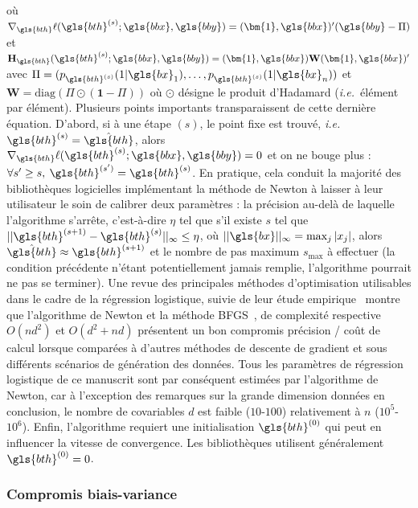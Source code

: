où $ \nabla_{\gls{bth}} \ell(\gls{bth}^{(s)};\gls{bbx},\gls{bby}) = (\bm{1},\gls{bbx})' (\gls{bby} - \Pi)$ et $\mathbf{H}_{{\gls{bth}}}(\gls{bth}^{(s)};\gls{bbx},\gls{bby}) = (\bm{1},\gls{bbx}) \mathbf{W} (\bm{1},\gls{bbx})'$ avec $\Pi = (p_{\gls{bth}^{(s)}}(1|\gls{bx}_1),\dots,p_{\gls{bth}^{(s)}}(1|\gls{bx}_n))$ et $\mathbf{W} = \text{diag}(\Pi \odot (\bm{1}-\Pi))$ où $\odot$ désigne le produit d'Hadamard (\textit{i.e.}\ élément par élément). Plusieurs points importants transparaissent de cette dernière équation. D'abord, si à une étape $(s)$, le point fixe est trouvé, \textit{i.e.}\ $\gls{bth}^{(s)} = \hat{\gls{bth}}$, alors $\nabla_{\gls{bth}} \ell(\gls{bth}^{(s)};\gls{bbx},\gls{bby}) = 0$ et on ne bouge plus : $\forall s' \geq s, \: \gls{bth}^{(s')} = \gls{bth}^{(s)}$. En pratique, cela conduit la majorité des bibliothèques logicielles implémentant la méthode de Newton à laisser à leur utilisateur le soin de calibrer deux paramètres : la précision au-delà de laquelle l'algorithme s'arrête, c'est-à-dire $\eta$ tel que s'il existe $s$ tel que $||\gls{bth}^{(s+1)} - \gls{bth}^{(s)}||_{\infty} \leq \eta$, où $|| \gls{bx} ||_{\infty} = \max_{j} |x_j|$, alors $\hat{\gls{bth}} \approx \gls{bth}^{(s+1)}$ et le nombre de pas maximum $s_{\text{max}}$ à effectuer (la condition précédente n'étant potentiellement jamais remplie, l'algorithme pourrait ne pas se terminer). Une revue des principales méthodes d'optimisation utilisables dans le cadre de la régression logistique, suivie de leur étude empirique~\cite{minka2003comparison} montre que l'algorithme de Newton et la méthode BFGS~\cite{byrd1995limited}, de complexité respective $O(nd^2)$ et $O(d^2 + nd)$ présentent un bon compromis précision / coût de calcul lorsque comparées à d'autres méthodes de descente de gradient et sous différents scénarios de génération des données. Tous les paramètres de régression logistique de ce manuscrit sont par conséquent estimées par l'algorithme de Newton, car à l'exception des remarques sur la grande dimension données en conclusion, le nombre de covariables $d$ est faible ($10$-$100$) relativement à $n$ ($10^5$-$10^6$). Enfin, l'algorithme requiert une initialisation $\gls{bth}^{(0)}$ qui peut en influencer la vitesse de convergence. Les bibliothèques utilisent généralement $\gls{bth}^{(0)}=0$.

\subsubsection{Compromis biais-variance} \label{subsubsec:tradeoff}

